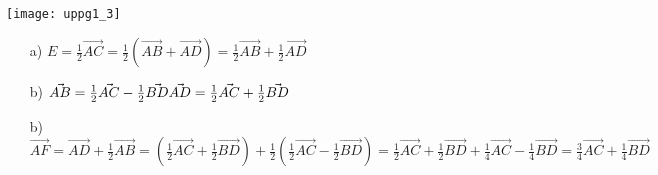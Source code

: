 \subsection{}
\texttt{[image: uppg1\_3]}
\begin{enumerate}
    \item[a)]
        \begin{math}
            E
            =\frac{1}{2}\vec{AC}
            =\frac{1}{2}(\vec{AB}+\vec{AD})
            =\frac{1}{2}\vec{AB}+\frac{1}{2}\vec{AD}
        \end{math}
    \item[b)]
        \begin{math}
            \vec{AB}
            =\frac{1}{2}\vec{AC}-\frac{1}{2}\vec{BD}
            \\
            \vec{AD}
            =\frac{1}{2}\vec{AC}+\frac{1}{2}\vec{BD}
        \end{math}
    \item[b)]
        \begin{math}
            \vec{AF}
            =\vec{AD}+\frac{1}{2}\vec{AB}
            =(\frac{1}{2}\vec{AC}+\frac{1}{2}\vec{BD})+\frac{1}{2}(\frac{1}{2}\vec{AC}-\frac{1}{2}\vec{BD})
            =\frac{1}{2}\vec{AC}+\frac{1}{2}\vec{BD}+\frac{1}{4}\vec{AC}-\frac{1}{4}\vec{BD}
            =\frac{3}{4}\vec{AC}+\frac{1}{4}\vec{BD}
        \end{math}
\end{enumerate}